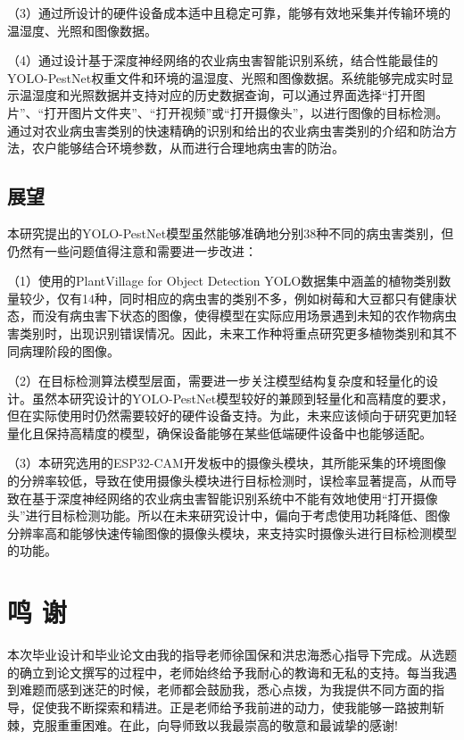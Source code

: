 \documentclass[12pt, a4paper, twoside]{ctexart}
\begin{document}
（3）通过所设计的硬件设备成本适中且稳定可靠，能够有效地采集并传输环境的温湿度、光照和图像数据。

（4）通过设计基于深度神经网络的农业病虫害智能识别系统，结合性能最佳的YOLO-PestNet权重文件和环境的温湿度、光照和图像数据。系统能够完成实时显示温湿度和光照数据并支持对应的历史数据查询，可以通过界面选择“打开图片”、“打开图片文件夹”、“打开视频”或“打开摄像头”，以进行图像的目标检测。通过对农业病虫害类别的快速精确的识别和给出的农业病虫害类别的介绍和防治方法，农户能够结合环境参数，从而进行合理地病虫害的防治。


\section{展望}

本研究提出的YOLO-PestNet模型虽然能够准确地分别38种不同的病虫害类别，但仍然有一些问题值得注意和需要进一步改进：

（1）使用的PlantVillage for Object Detection YOLO数据集中涵盖的植物类别数量较少，仅有14种，同时相应的病虫害的类别不多，例如树莓和大豆都只有健康状态，而没有病虫害下状态的图像，使得模型在实际应用场景遇到未知的农作物病虫害类别时，出现识别错误情况。因此，未来工作种将重点研究更多植物类别和其不同病理阶段的图像。

（2）在目标检测算法模型层面，需要进一步关注模型结构复杂度和轻量化的设计。虽然本研究设计的YOLO-PestNet模型较好的兼顾到轻量化和高精度的要求，但在实际使用时仍然需要较好的硬件设备支持。为此，未来应该倾向于研究更加轻量化且保持高精度的模型，确保设备能够在某些低端硬件设备中也能够适配。

（3）本研究选用的ESP32-CAM开发板中的摄像头模块，其所能采集的环境图像的分辨率较低，导致在使用摄像头模块进行目标检测时，误检率显著提高，从而导致在基于深度神经网络的农业病虫害智能识别系统中不能有效地使用“打开摄像头”进行目标检测功能。所以在未来研究设计中，偏向于考虑使用功耗降低、图像分辨率高和能够快速传输图像的摄像头模块，来支持实时摄像头进行目标检测模型的功能。


\chapter{鸣  谢}

本次毕业设计和毕业论文由我的指导老师徐国保和洪忠海悉心指导下完成。从选题的确立到论文撰写的过程中，老师始终给予我耐心的教诲和无私的支持。每当我遇到难题而感到迷茫的时候，老师都会鼓励我，悉心点拨，为我提供不同方面的指导，促使我不断探索和精进。正是老师给予我前进的动力，使我能够一路披荆斩棘，克服重重困难。在此，向导师致以我最崇高的敬意和最诚挚的感谢!
\end{document}
